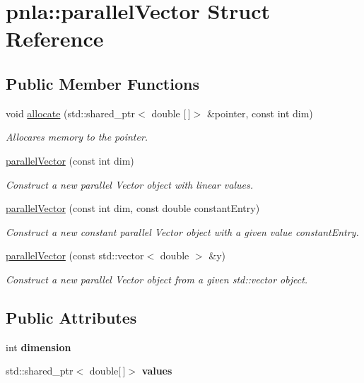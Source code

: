 \hypertarget{structpnla_1_1parallelVector}{}\section{pnla\+:\+:parallel\+Vector Struct Reference}
\label{structpnla_1_1parallelVector}
\subsection*{Public Member Functions}
\begin{DoxyCompactItemize}
\item 
void \mbox{\hyperlink{structpnla_1_1parallelVector_a47a92803332ce110eb8b094adc85989f}{allocate}} (std\+::shared\+\_\+ptr$<$ double \mbox{[}$\,$\mbox{]}$>$ \&pointer, const int dim)
\begin{DoxyCompactList}\small\item\em Allocares memory to the pointer. \end{DoxyCompactList}\item 
\mbox{\hyperlink{structpnla_1_1parallelVector_aa8465795b374247fbfc8bf86ab50ce5c}{parallel\+Vector}} (const int dim)
\begin{DoxyCompactList}\small\item\em Construct a new parallel Vector object with linear values. \end{DoxyCompactList}\item 
\mbox{\hyperlink{structpnla_1_1parallelVector_abcf601efe8badd8bb081f4ee5a8fc325}{parallel\+Vector}} (const int dim, const double constant\+Entry)
\begin{DoxyCompactList}\small\item\em Construct a new constant parallel Vector object with a given value constant\+Entry. \end{DoxyCompactList}\item 
\mbox{\hyperlink{structpnla_1_1parallelVector_ad543dc44e8e582c75be49d16661b73f5}{parallel\+Vector}} (const std\+::vector$<$ double $>$ \&y)
\begin{DoxyCompactList}\small\item\em Construct a new parallel Vector object from a given std\+::vector object. \end{DoxyCompactList}\end{DoxyCompactItemize}
\subsection*{Public Attributes}
\begin{DoxyCompactItemize}
\item 
\mbox{\label{structpnla_1_1parallelVector_afee460aeded297a4b7c4e4b1ec1c640d}} 
int {\bfseries dimension}
\item 
\mbox{\label{structpnla_1_1parallelVector_aacceb72f65e97ac52cd6b09946266a85}} 
std\+::shared\+\_\+ptr$<$ double\mbox{[}$\,$\mbox{]}$>$ {\bfseries values}
\end{DoxyCompactItemize}


